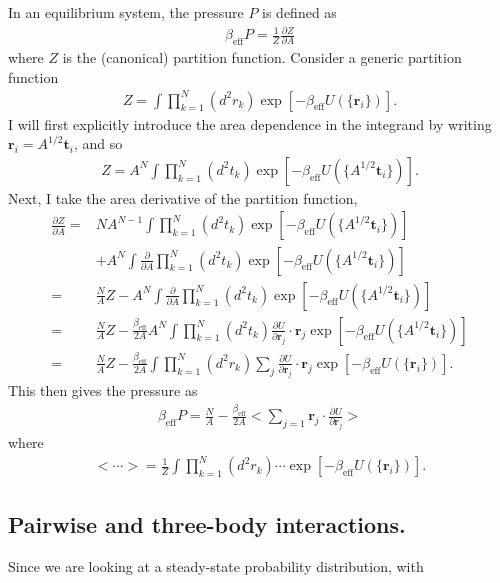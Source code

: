 \documentclass[../main.tex]{subfiles}
\begin{document}
In an equilibrium system, the pressure $P$ is defined as
\begin{align}
  \beta_{\mathrm{eff}} P = \frac{1}{Z}\frac{\partial Z}{\partial A}
\end{align}
where $Z$ is the (canonical) partition function. Consider a generic
partition function
\begin{align}
  Z=\int\prod_{k=1}^N(d^2r_k)\exp[-\beta_{\mathrm{eff}} U(\{\bm{r}_i\})].
\end{align}
I will first explicitly introduce the area dependence in the integrand by
writing $\bm{r}_i = A^{1/2}\bm{t}_i$, and so
\begin{align}
  Z = A^N\int\prod_{k=1}^N(d^2t_k)\exp[-\beta_{\mathrm{eff}} U(\{A^{1/2}\bm{t}_i\})].
\end{align}
Next, I take the area derivative of the partition function,
\begin{align}
  \frac{\partial Z}{\partial A}
  =&NA^{N-1}\int\prod_{k=1}^N(d^2t_k)\exp[-\beta_{\mathrm{eff}} U(\{A^{1/2}\bm{t}_i\})]
  \nonumber\\
  &+A^N\int\frac{\partial}{\partial A}\prod_{k=1}^N(d^2t_k)
  \exp[-\beta_{\mathrm{eff}} U(\{A^{1/2}\bm{t}_i\})]\nonumber\\
  =&\frac{N}{A}Z
  -A^N\int\frac{\partial}{\partial A}\prod_{k=1}^N(d^2t_k)
  \exp[-\beta_{\mathrm{eff}} U(\{A^{1/2}\bm{t}_i\})]\nonumber\\
  =&\frac{N}{A}Z
  -\frac{\beta_{\mathrm{eff}}}{2A}A^N\int\prod_{k=1}^N(d^2t_k)
  \frac{\partial U}{\partial\bm{r}_j}\cdot
  \bm{r}_j\exp[-\beta_{\mathrm{eff}} U(\{A^{1/2}\bm{t}_i\})]\nonumber\\
  =&\frac{N}{A}Z
  -\frac{\beta_{\mathrm{eff}}}{2A}\int\prod_{k=1}^N(d^2r_k)
  \sum_{j}\frac{\partial U}{\partial\bm{r}_j}\cdot
  \bm{r}_j\exp[-\beta_{\mathrm{eff}} U(\{\bm{r}_i\})].
\end{align}
This then gives the pressure as
\begin{align}\label{eq:P_with_U}
  \beta_{\mathrm{eff}} P = \frac{N}{A}
  -\frac{\beta_{\mathrm{eff}}}{2A}\bigg<\sum_{j=1}\bm{r}_j\cdot
  \frac{\partial U}{\partial\bm{r}_j}\bigg>
\end{align}
where
\begin{align}
  <\cdots> = \frac{1}{Z}
  \int\prod_{k=1}^N(d^2r_k)
  \cdots\exp[-\beta_{\mathrm{eff}} U(\{\bm{r}_i\})].
\end{align}

\subsection{Pairwise and three-body interactions.\label{app:onlytwobody}}
Since we are looking at a steady-state probability distribution, with
\end{document}
